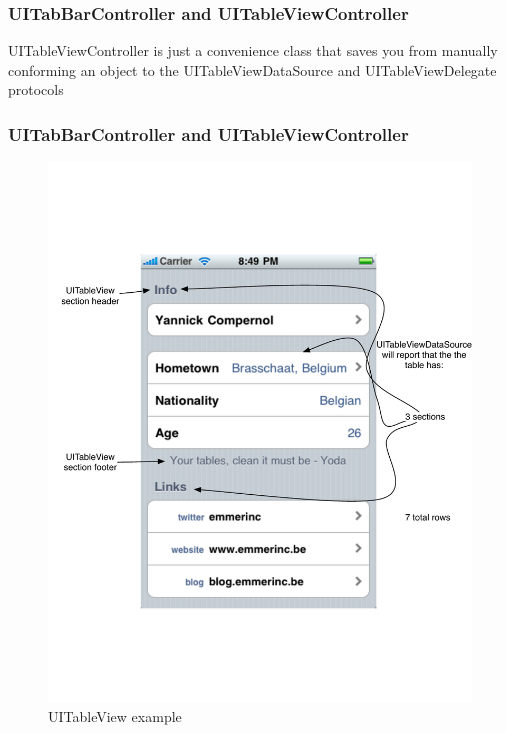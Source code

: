 \documentclass[10pt]{beamer}
\begin{document}
\begin{frame}[fragile]
  \frametitle{UITabBarController and UITableViewController}
  UITableViewController is just a convenience class that saves you from manually conforming an object to the UITableViewDataSource and UITableViewDelegate protocols

\end{frame}

\begin{frame}[fragile]
  \frametitle{UITabBarController and UITableViewController}
  \begin{figure}[htb]
  \begin{center}
  
  \includegraphics[scale=0.3]{UIViewExample5.pdf}
              
  \caption{UITableView example}
  \end{center}
  \end{figure}

\end{frame}
\end{document}
